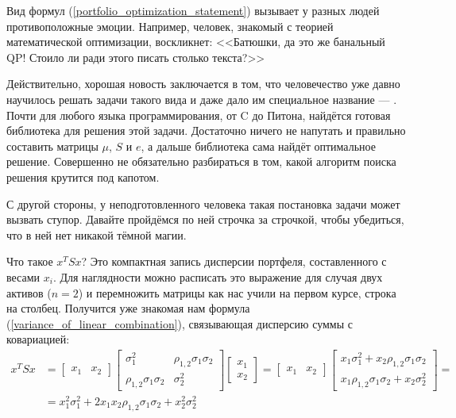 Вид формул (\ref{portfolio_optimization_statement}) вызывает у разных людей 
противоположные эмоции. Например, человек, знакомый с теорией математической 
оптимизации, воскликнет: <<Батюшки, да это же банальный QP! Стоило ли ради этого 
писать столько текста?>>

Действительно, хорошая новость заключается в том, что человечество уже давно 
научилось решать задачи такого вида и даже дало им специальное название --- 
 \cite[ch.~7--8]
{cornuejols2006optimization}. Почти для любого языка программирования, от C до 
Питона, найдётся готовая библиотека для решения этой задачи. Достаточно ничего 
не напутать и правильно составить матрицы $\mu$, $S$ и $e$, а дальше библиотека 
сама найдёт оптимальное решение. Совершенно не обязательно разбираться в том, 
какой алгоритм поиска решения крутится под капотом.

С другой стороны, у неподготовленного человека такая постановка задачи может 
вызвать ступор. Давайте пройдёмся по ней строчка за строчкой, чтобы убедиться, 
что в ней нет никакой тёмной магии.

Что такое $x^TSx$? Это компактная запись дисперсии портфеля, составленного с 
весами $x_i$. Для наглядности можно расписать это выражение для случая двух 
активов ($n=2$) и перемножить матрицы как нас учили на первом курсе, строка на 
столбец. Получится уже знакомая нам формула 
(\ref{variance_of_linear_combination}), связывающая дисперсию суммы с 
ковариацией:
\begin{align*}
x^TSx &= 
\begin{bmatrix}x_1 & x_2\end{bmatrix}
\begin{bmatrix}
\sigma_1^2 & \rho_{1,2}\sigma_1\sigma_2 \\
\rho_{1,2}\sigma_1\sigma_2 & \sigma_2^2
\end{bmatrix}
\begin{bmatrix}
x_1 \\
x_2
\end{bmatrix}
=
\begin{bmatrix}x_1 & x_2\end{bmatrix}
\begin{bmatrix}
x_1\sigma_1^2 + x_2\rho_{1,2}\sigma_1\sigma_2 \\
x_1\rho_{1,2}\sigma_1\sigma_2 + x_2\sigma_2^2
\end{bmatrix} = \\
&= 
x_1^2\sigma_1^2 + 2x_1x_2\rho_{1,2}\sigma_1\sigma_2 + x_2^2\sigma_2^2
\end{align*}

